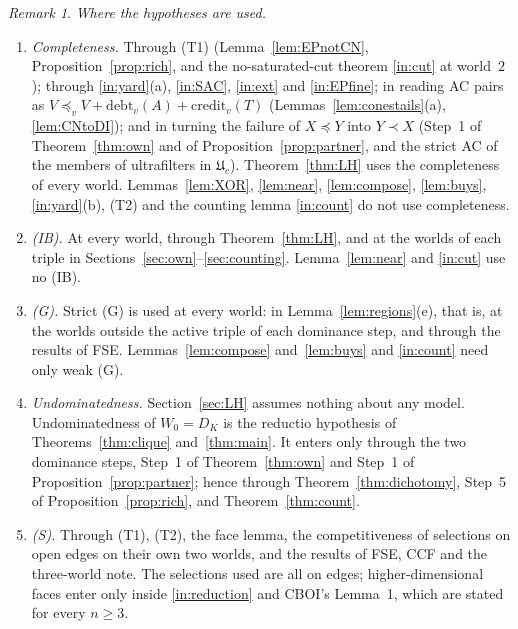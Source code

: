 \documentclass[11pt]{article}
\theoremstyle{definition}\newtheorem{definition}[theorem]{Definition}
\theoremstyle{remark}\newtheorem{remark}[theorem]{Remark}
\newcommand{\debt}{\mathrm{debt}}
\newcommand{\cred}{\mathrm{credit}}
\newcommand{\UU}{\mathfrak U}
\begin{document}
\begin{remark}\label{rem:hyp}
\emph{Where the hypotheses are used.}
\begin{enumerate}[label=(\alph*),leftmargin=*,itemsep=2pt]
\item \emph{Completeness.} Through (T1) (Lemma~\ref{lem:EPnotCN},
Proposition~\ref{prop:rich}, and the no-saturated-cut theorem \ref{in:cut}
at world~$2$); through \ref{in:yard}(a), \ref{in:SAC}, \ref{in:ext} and
\ref{in:EPfine}; in reading AC pairs as $V\preceq_vV+\debt_v(A)+\cred_v(T)$
(Lemmas~\ref{lem:conestails}(a), \ref{lem:CNtoDI}); and in turning the
failure of $X\preceq Y$ into $Y\prec X$ (Step~1 of Theorem~\ref{thm:own}
and of Proposition~\ref{prop:partner}, and the strict AC of the members of
ultrafilters in $\UU_c$). Theorem~\ref{thm:LH} uses the completeness of
every world. Lemmas~\ref{lem:XOR}, \ref{lem:near}, \ref{lem:compose},
\ref{lem:buys}, \ref{in:yard}(b), (T2) and the counting lemma
\ref{in:count} do not use completeness.
\item \emph{(IB).} At every world, through Theorem~\ref{thm:LH}, and at
the worlds of each triple in Sections~\ref{sec:own}--\ref{sec:counting}.
Lemma~\ref{lem:near} and \ref{in:cut} use no (IB).
\item \emph{(G).} Strict (G) is used at every world: in
Lemma~\ref{lem:regions}(e), that is, at the worlds outside the active
triple of each dominance step, and through the results of FSE.
Lemmas~\ref{lem:compose} and~\ref{lem:buys} and \ref{in:count} need only
weak (G).
\item \emph{Undominatedness.} Section~\ref{sec:LH} assumes nothing about
any model. Undominatedness of $W_0=D_K$ is the reductio hypothesis of
Theorems~\ref{thm:clique} and~\ref{thm:main}. It enters only through the
two dominance steps, Step~1 of Theorem~\ref{thm:own} and Step~1 of
Proposition~\ref{prop:partner}; hence through Theorem~\ref{thm:dichotomy},
Step~5 of Proposition~\ref{prop:rich}, and Theorem~\ref{thm:count}.
\item \emph{(S).} Through (T1), (T2), the face lemma, the competitiveness
of selections on open edges on their own two worlds, and the results of
FSE, CCF and the three-world note. The selections used are all on edges;
higher-dimensional faces enter only inside \ref{in:reduction} and CBOI's
Lemma~1, which are stated for every $n\ge3$.
\end{enumerate}
\end{remark}
\end{document}
